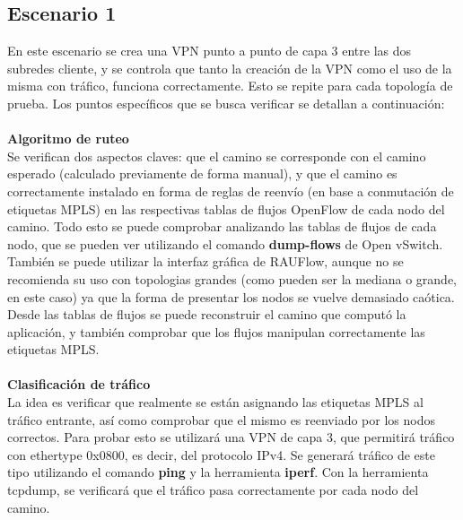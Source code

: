 \subsection{Escenario 1}
En este escenario se crea una VPN punto a punto de capa 3 entre las dos subredes cliente, y se controla que tanto la creación de la VPN como el uso de la misma con tráfico, funciona correctamente. Esto se repite para cada topología de prueba. Los puntos específicos que se busca verificar se detallan a continuación: \\ \\
\textbf{Algoritmo de ruteo} \\
Se verifican dos aspectos claves: que el camino se corresponde con el camino esperado (calculado previamente de forma manual), y que el camino es correctamente instalado en forma de reglas de reenvío (en base a conmutación de etiquetas MPLS) en las respectivas tablas de flujos OpenFlow de cada nodo del camino. Todo esto se puede comprobar analizando las tablas de flujos de cada nodo, que se pueden ver utilizando el comando \textbf{dump-flows} de Open vSwitch. También se puede utilizar la interfaz gráfica de RAUFlow, aunque no se recomienda su uso con topologias grandes (como pueden ser la mediana o grande, en este caso) ya que la forma de presentar los nodos se vuelve demasiado caótica. Desde las tablas de flujos se puede reconstruir el camino que computó la aplicación, y también comprobar que los flujos manipulan correctamente las etiquetas MPLS. \\ \\
\textbf{Clasificación de tráfico} \\
La idea es verificar que realmente se están asignando las etiquetas MPLS al tráfico entrante, así como comprobar que el mismo es reenviado por los nodos correctos. Para probar esto se utilizará una VPN de capa 3, que permitirá tráfico con ethertype 0x0800, es decir, del protocolo IPv4. Se generará tráfico de este tipo utilizando el comando \textbf{ping} y la herramienta \textbf{iperf}. Con la herramienta tcpdump, se verificará que el tráfico pasa correctamente por cada nodo del camino. \\

\begin{table}[ht]
	\caption{Pasos que cumple cada caso en la creación y uso exitoso de un servicio.}
	\centering 
	\label{table:problemas_por_topologia}
\end{table}

